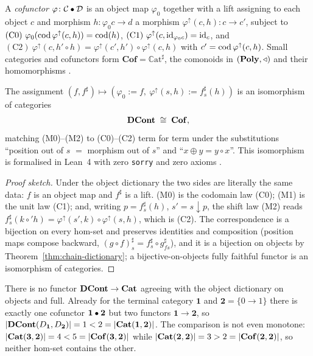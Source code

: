 \begin{definition}\label{def:chain-cofunctor}
A \emph{cofunctor} $\varphi\colon\mathcal C\mathbin{\text{\small$\bullet$}}\mathcal D$ is an object map
$\varphi_0$ together with a lift assigning to each object $c$ and morphism
$h\colon\varphi_0c\to d$ a morphism $\varphi^{\uparrow}(c,h)\colon c\to c'$,
subject to
$\mathrm{(C0)}\ \varphi_0(\cod\varphi^{\uparrow}(c,h))=\cod(h)$,
$\mathrm{(C1)}\ \varphi^{\uparrow}(c,\id_{\varphi_0c})=\id_c$, and
$\mathrm{(C2)}\ \varphi^{\uparrow}(c,h'\circ h)
=\varphi^{\uparrow}(c',h')\circ\varphi^{\uparrow}(c,h)$ with
$c'=\operatorname{cod}\varphi^{\uparrow}(c,h)$. Small categories and cofunctors form
$\mathbf{Cof}=\mathbb C\mathrm{at}^{\sharp}$, the comonoids in
$(\mathbf{Poly},\triangleleft)$ and their homomorphisms \cite{Spi21,SS23}.
\end{definition}

\begin{theorem}\label{thm:chain-morphisms}
The assignment $(f,f^{\sharp})\mapsto(\varphi_0:=f,\ \varphi^{\uparrow}(s,h):=f^{\sharp}_{s}(h))$
is an isomorphism of categories
\[
  \mathbf{DCont}\;\cong\;\mathbf{Cof},
\]
matching \textup{(M0)--(M2)} to \textup{(C0)--(C2)} term for term under the
substitutions ``position out of $s$ $=$ morphism out of $s$'' and
``$x\oplus y=y\circ x$''. This isomorphism is formalised in Lean~4 with zero
\texttt{sorry} and zero axioms \cite{MacBethBase}.
\end{theorem}

\begin{proof}[Proof sketch]
Under the object dictionary the two sides are literally the same data: $f$ is an
object map and $f^{\sharp}$ is a lift. (M0) is the codomain law (C0); (M1) is the
unit law (C1); and, writing $p=f^{\sharp}_s(h)$, $s'=s\downarrow p$, the shift
law (M2) reads
$f^{\sharp}_s(k\circ'h)=\varphi^{\uparrow}(s',k)\circ\varphi^{\uparrow}(s,h)$,
which is (C2). The correspondence is a bijection on every hom-set and preserves
identities and composition (position maps compose backward,
$(g\circ f)^{\sharp}_s=f^{\sharp}_s\circ g^{\sharp}_{fs}$), and it is a bijection
on objects by Theorem~\ref{thm:chain-dictionary}; a bijective-on-objects fully
faithful functor is an isomorphism of categories.
\end{proof}

\begin{proposition}\label{prop:chain-notcat}
There is no functor $\mathbf{DCont}\to\mathbf{Cat}$ agreeing with the object dictionary on
objects and full. Already for the terminal category $\mathbf 1$ and
$\mathbf 2=\{0\to1\}$ there is exactly one cofunctor $\mathbf 1\mathbin{\text{\small$\bullet$}}\mathbf 2$ but
two functors $\mathbf 1\to\mathbf 2$, so
$|\mathbf{DCont}(D_{\mathbf 1},D_{\mathbf 2})|=1<2=|\mathbf{Cat}(\mathbf 1,\mathbf 2)|$. The
comparison is not even monotone: $|\mathbf{Cat}(\mathbf 3,\mathbf 2)|=4<5=|\mathbf{Cof}(\mathbf 3,\mathbf 2)|$
while $|\mathbf{Cat}(\mathbf 2,\mathbf 2)|=3>2=|\mathbf{Cof}(\mathbf 2,\mathbf 2)|$, so
neither hom-set contains the other.
\end{proposition}

